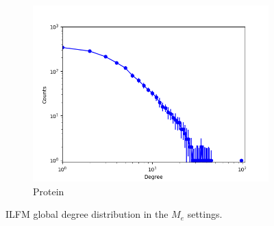 \begin{figure}[h]
\begin{subfigure}[b]{0.300\textwidth}
            \includegraphics[width=\textwidth]{img/corpus/ilfm_protein_0}
            \caption {{\small Protein}}    
            \label{fig:mean and std of net14}
        \end{subfigure}
        \caption{ILFM global degree distribution in the $M_e$ settings. } 
        \label{fig:me_fit_gburst_ilfm}
\end{figure}
